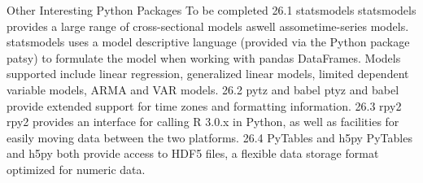 Other Interesting Python Packages
To be completed
26.1 statsmodels
statsmodels provides a large range of cross-sectional models aswell assometime-series models. statsmodels
uses a model descriptive language (provided via the Python package patsy) to formulate the model
when working with pandas DataFrames. Models supported include linear regression, generalized linear
models, limited dependent variable models, ARMA and VAR models.
26.2 pytz and babel
ptyz and babel provide extended support for time zones and formatting information.
26.3 rpy2
rpy2 provides an interface for calling R 3.0.x in Python, as well as facilities for easily moving data between
the two platforms.
26.4 PyTables and h5py
PyTables and h5py both provide access to HDF5 files, a flexible data storage format optimized for numeric
data.
